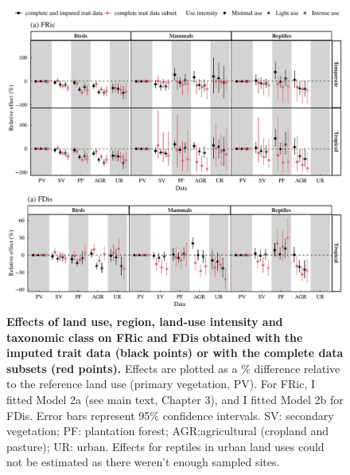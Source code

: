 \begin{figure}[h!]
\centering
\includegraphics[scale=0.7]{Supporting/Chapter3/Figures/SI_Comparison_complete}
\caption[Effects of land use, region, land-use intensity and taxonomic class on FRic and FDis obtained with the imputed trait data (black points) or with the complete data subsets (red points)]{\textbf{Effects of land use, region, land-use intensity and taxonomic class on FRic and FDis obtained with the imputed trait data (black points) or with the complete data subsets (red points).} Effects are plotted as a \% difference relative to the reference land use (primary vegetation, PV). For FRic, I fitted Model 2a (see main text, Chapter 3), and I fitted Model 2b for FDis. Error bars represent 95\% confidence intervals. SV: secondary vegetation; PF: plantation forest; AGR:agricultural (cropland and pasture); UR: urban. Effects for reptiles in urban land uses could not be estimated as there weren’t enough sampled sites.}
\label{SI3_F23}
\end{figure}

